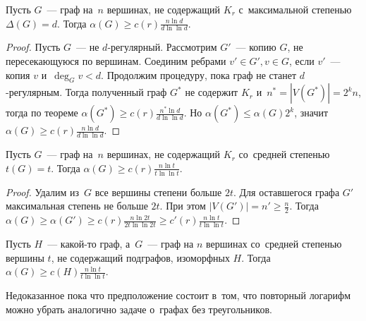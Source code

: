 \documentclass{article}
\begin{document}
\begin{corollary}
	Пусть $G$~--- граф на~$n$ вершинах, не содержащий $K_r$ с~максимальной
	степенью $\Delta(G) = d$. Тогда $\alpha(G) \ge c(r)
	\frac{n \ln d}{d \ln \ln d}$.
\end{corollary}
\begin{proof}
	Пусть $G$~--- не $d$-регулярный. Рассмотрим $G'$~--- копию $G$, не
	пересекающуюся по вершинам. Соединим ребрами $v' \in G', v \in G$, если
	$v'$~--- копия $v$ и~$\deg_G v < d$. Продолжим процедуру, пока граф не станет
	$d$-регулярным. Тогда полученный граф $G^\ast$ не содержит $K_r$ и~$n^\ast =
	|V(G^\ast)| = 2^k n$, тогда по теореме $\alpha(G^\ast) \ge c(r) \frac{n^\ast
	\ln d}{d \ln \ln d}$. Но $\alpha(G^\ast) \le \alpha(G) 2^k$, значит $\alpha(G)
	\ge c(r) \frac{n \ln d}{d \ln \ln d}$.
\end{proof}

\begin{corollary}
	Пусть $G$~--- граф на~$n$ вершинах, не содержащий $K_r$ со~средней
	степенью $t(G) = t$. Тогда $\alpha(G) \ge c(r) \frac{n \ln t}{t \ln \ln t}$.
\end{corollary}
\begin{proof}
	Удалим из~$G$ все вершины степени больше $2t$. Для оставшегося графа $G'$
	максимальная степень не больше $2t$. При этом $|V(G')| = n' \ge \frac{n}{2}$.
	Тогда $\alpha(G) \ge \alpha(G') \ge c(r) \frac{n \ln 2t}{2t \ln \ln 2t} \ge
	c'(r) \frac{n \ln t}{t \ln \ln t}$.
\end{proof}

\begin{corollary}
	Пусть $H$~--- какой-то граф, а~$G$~--- граф на $n$ вершинах со~средней
	степенью вершины $t$, не содержащий подграфов, изоморфных $H$. Тогда
	$\alpha(G) \ge c(H) \frac{n \ln t}{t \ln \ln t}$.
\end{corollary}

Недоказанное пока что предположение состоит в~том, что повторный логарифм можно
убрать аналогично задаче о~графах без треугольников.
\end{document}
